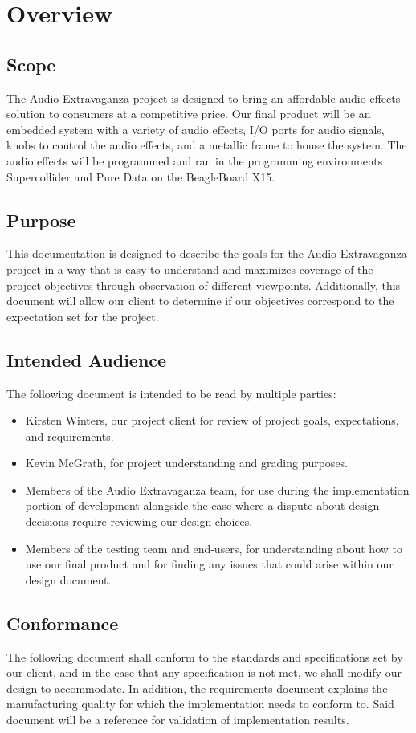 \section{Overview}

\subsection{Scope}
The Audio Extravaganza project is designed to bring an affordable audio effects solution to consumers at a competitive price. Our final product will be an embedded system with a variety of audio effects, I/O ports for audio signals, knobs to control the audio effects, and a metallic frame to house the system. The audio effects will be programmed and ran in the programming environments Supercollider and Pure Data on the BeagleBoard X15.

\subsection{Purpose}
This documentation is designed to describe the goals for the Audio Extravaganza project in a way that is easy to understand and maximizes coverage of the project objectives through observation of different viewpoints. Additionally, this document will allow our client to determine if our objectives correspond to the expectation set for the project.

\subsection{Intended Audience}
The following document is intended to be read by multiple parties:
\begin{itemize}
\item Kirsten Winters, our project client for review of project goals, expectations, and requirements.
\item Kevin McGrath, for project understanding and grading purposes.
\item Members of the Audio Extravaganza team, for use during the implementation portion of development alongside the case where a dispute about design decisions require reviewing our design choices.
\item Members of the testing team and end-users, for understanding about how to use our final product and for finding any issues that could arise within our design document.
\end{itemize}

\subsection{Conformance}
The following document shall conform to the standards and specifications set by our client, and in the case that any specification is not met, we shall modify our design to accommodate. In addition, the requirements document explains the manufacturing quality for which the implementation needs to conform to. Said document will be a reference for validation of implementation results. 